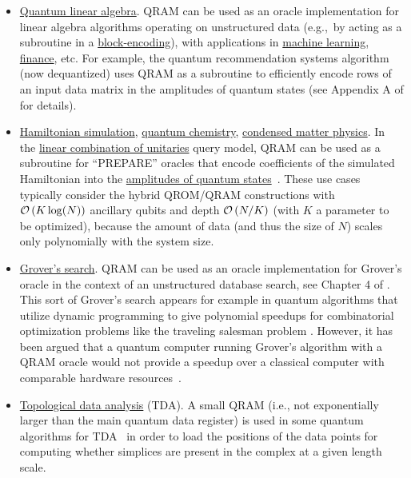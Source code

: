 \begin{refsection}
\begin{itemize}
    \item \hyperref[prim:LinearAlgebra]{Quantum linear algebra}. QRAM can be used as an oracle implementation for linear algebra algorithms operating on unstructured data (e.g.,~by acting as a subroutine in a \hyperref[prim:BlockEncodingsClassical]{block-encoding}), with applications in \hyperref[appl:ClassicalML]{machine learning}, \hyperref[appl:finance]{finance}, etc. For example, the quantum recommendation systems algorithm~\cite{kerenidis2016QRecSys} (now dequantized) uses QRAM as a subroutine to efficiently encode rows of an input data matrix in the amplitudes of quantum states (see Appendix A of \cite{kerenidis2016QRecSys} for details).   
    \item \hyperref[prim:HamiltonianSimulation]{Hamiltonian simulation}, \hyperref[appl:ElectronicStructure]{quantum chemistry}, \hyperref[appl:CondensedMatter]{condensed matter physics}. In the \hyperref[prim:LCU]{linear combination of unitaries} query model, QRAM can be used as a subroutine for ``PREPARE'' oracles that encode coefficients of the simulated Hamiltonian into the \hyperref[prim:StatePrepData]{amplitudes of quantum states}~\cite{babbush2018EncodingElectronicSpectraLinearT}. These use cases typically consider the hybrid QROM/QRAM constructions with $\mathcal{O}\left( K \log(N) \right)$ ancillary qubits and depth $\mathcal{O}\left( N/K \right)$ (with $K$ a parameter to be optimized), because the amount of data (and thus the size of $N$) scales only polynomially with the system size.  
    \item \hyperref[prim:AA]{Grover's search}. QRAM can be used as an oracle implementation for Grover's oracle in the context of an unstructured database search, see Chapter 4 of \cite{nielsen2002QCQI}. This sort of Grover's search appears for example in quantum algorithms that utilize dynamic programming to give polynomial speedups for combinatorial optimization problems like the traveling salesman problem \cite{ambainis2019QSpeedUpExpTimeDPAlgs}.  However, it has been argued that a quantum computer running Grover's algorithm with a QRAM oracle would not provide a speedup over a classical computer with comparable hardware resources~\cite{steiger2016RacingInParallel}. 
    \item \hyperref[appl:TDA]{Topological data analysis} (TDA). A small QRAM (i.e., not exponentially larger than the main quantum data register) is used in some quantum algorithms for TDA~\cite{lloyd2016quantumTDA,mcardle2022streamlinedTDA} in order to load the positions of the data points for computing whether simplices are present in the complex at a given length scale.
\end{itemize}


\end{refsection}
